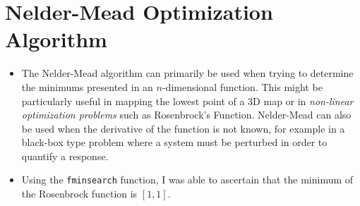 \documentclass[12pt]{extarticle}
\begin{document}
\section{Nelder-Mead Optimization Algorithm}
\begin{itemize}
\item The Nelder-Mead algorithm can primarily be used when trying to determine the minimums presented in an $n$-dimensional function. This might be particularly useful in mapping the lowest point of a 3D map or in \textit{non-linear optimization problems} such as Rosenbrock's Function. Nelder-Mead can also be used when the derivative of the function is not known, for example in a black-box type problem where a system must be perturbed in order to quantify a response.

\item Using the \verb|fminsearch| function, I was able to ascertain that the minimum of the Rosenbrock function is $[1,1]$.
\end{itemize}
\end{document}
